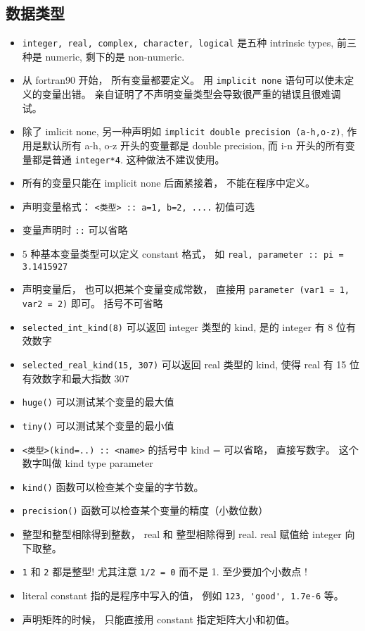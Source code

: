 \subsection{数据类型}
\begin{itemize}
\item \verb`integer, real, complex, character, logical` 是五种 intrinsic types, 前三种是 numeric, 剩下的是 non-numeric.
\item 从 fortran90 开始， 所有变量都要定义。 用 \verb`implicit none` 语句可以使未定义的变量出错。 亲自证明了不声明变量类型会导致很严重的错误且很难调试。
\item 除了 imlicit none, 另一种声明如 \verb`implicit double precision (a-h,o-z)`, 作用是默认所有 a-h, o-z 开头的变量都是 double precision, 而 i-n 开头的所有变量都是普通 \verb`integer*4`. 这种做法不建议使用。
\item 所有的变量只能在 implicit none 后面紧接着， 不能在程序中定义。
\item 声明变量格式：  \verb`<类型> :: a=1, b=2, ....`  初值可选
\item 变量声明时 \verb`::` 可以省略
\item 5 种基本变量类型可以定义 constant 格式， 如  \verb`real, parameter :: pi = 3.1415927`
\item 声明变量后， 也可以把某个变量变成常数， 直接用 \verb`parameter (var1 = 1, var2 = 2)` 即可。 括号不可省略
\item \verb`selected_int_kind(8)` 可以返回 integer 类型的 kind, 是的 integer 有 8 位有效数字
\item \verb`selected_real_kind(15, 307)` 可以返回 real 类型的 kind, 使得 real 有 15 位有效数字和最大指数 307
\item \verb`huge()` 可以测试某个变量的最大值
\item \verb`tiny()` 可以测试某个变量的最小值
\item \verb`<类型>(kind=..) :: <name>` 的括号中 kind = 可以省略， 直接写数字。 这个数字叫做 kind type parameter
\item \verb`kind()` 函数可以检查某个变量的字节数。
\item \verb`precision()` 函数可以检查某个变量的精度（小数位数）
\item 整型和整型相除得到整数， real 和 整型相除得到 real. real 赋值给 integer 向下取整。
\item \verb`1` 和 \verb`2` 都是整型! 尤其注意 \verb`1/2 = 0` 而不是 1.   至少要加个小数点 !
\item literal constant 指的是程序中写入的值， 例如 \verb`123, 'good', 1.7e-6` 等。
\item 声明矩阵的时候， 只能直接用 constant 指定矩阵大小和初值。
\end{itemize}

